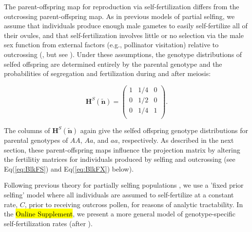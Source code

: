\documentclass[11pt]{article}
\def\mbf#1{\mathbf{#1}}
\begin{document}
The parent-offspring map for reproduction via self-fertilization differs from the outcrossing parent-offspring map. As in previous models of partial selfing, we assume that individuals produce enough male gametes to easily self-fertilize all of their ovules, and that self-fertilization involves little or no selection via the male sex function from external factors (e.g., pollinator visitation) relative to outcrossing (\citealt{Charlesworth1978a,JordanConnallon2014,Olito2017}, but see \citealt{Tazzyman2015}). Under these assumptions, the genotype distributions of selfed offspring are determined entirely by the parental genotype and the probabilities of segregation and fertilization during and after meiosis: 
\begin{linenomath*}
\begin{equation} \label{eq:HS}
	\mbf{H}^S(\tilde{\mbf{n}}) = 
			\left(
			\begin{array}{ccc}
				1 & 1/4 & 0 \\
				0 & 1/2 & 0 \\
				0 & 1/4 & 1 \\
			\end{array} \right).
\end{equation}
\end{linenomath*}
\noindent The columns of $\mbf{H}^S(\tilde{\mbf{n}})$ again give the selfed offspring genotype distributions for parental genotypes of $AA$, $Aa$, and $aa$, respectively. As described in the next section, these parent-offspring maps influence the projection matrix by altering the fertilitiy matrices for individuals produced by selfing and outcrossing (see Eq(\ref{eq:BlkFS}) and Eq(\ref{eq:BlkFX}) below).

Following previous theory for partially selfing populations \cite[e.g.,][]{Charlesworth2010,JordanConnallon2014,Glemin2021}, we use a 'fixed prior selfing' model where all individuals are assumed to self-fertilize at a constant rate, $C$, prior to receiving outcross pollen, for reasons of analytic tractability. In the \hl{Online Supplement}, we present a more general model of genotype-specific self-fertilization rates (after \citealt{JordanConnallon2014}). 

\end{document}
